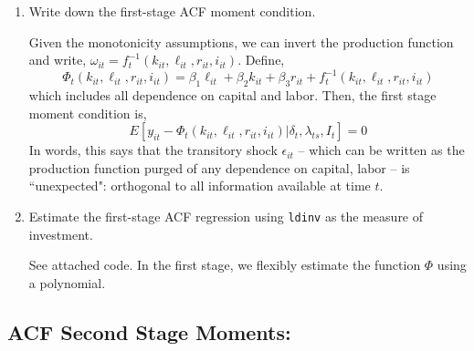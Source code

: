 \documentclass{article}
\begin{document}
\begin{enumerate}

\item Write down the first-stage ACF moment condition.


\begin{answer}
Given the monotonicity assumptions, we can invert the production function and write, $\omega_{it}=f_t^{-1}(k_{it},\ell_{it},r_{it},i_{it})$. Define,
$$\Phi_t (k_{it},\ell_{it},r_{it},i_{it}) = \beta_1 \ell_{it} + \beta_2 k_{it} + \beta_3 r_{it} + f_t^{-1}(k_{it},\ell_{it},r_{it},i_{it})$$
which includes all dependence on capital and labor. Then, the first stage moment condition is,
$$E[y_{it} - \Phi_t(k_{it},\ell_{it},r_{it},i_{it})|\delta_t,\lambda_{ts},I_t]=0$$
In words, this says that the transitory shock $\epsilon_{it}$ -- which can be written as the production function purged of any dependence on capital, labor -- is ``unexpected": orthogonal to all information available at time $t$.
\end{answer}

\item Estimate the first-stage ACF regression using \texttt{ldinv} as the measure of investment.

\begin{answer}
See attached code. In the first stage, we flexibly estimate the function $\Phi$ using a polynomial.
\end{answer}

\end{enumerate}

\subsection{ACF Second Stage Moments:}
\end{document}

